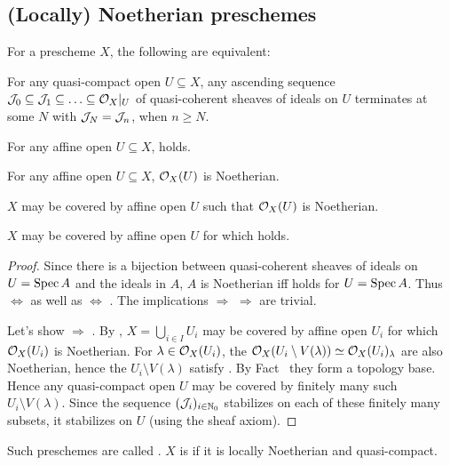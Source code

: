 \documentclass[a4paper,parskip=half,numbers=enddot, DIV=12]{scrreprt}
\begin{document}
\subsection{(Locally) Noetherian preschemes}

\begin{prop}
    For a prescheme $X$, the following are equivalent:
    \begin{alphanumerate}
    \item 
        For any quasi-compact open $U\subseteq X$, any ascending sequence $\mathcal{J}_0\subseteq \mathcal{J}_1\subseteq\ldots \subseteq \mathcal{O}_X|_U$ of quasi-coherent sheaves of ideals on $U$ terminates at some $N$ with $\mathcal{J}_N= \mathcal{J}_n$, when $n\geq N$.
    \item 
        For any affine open $U\subseteq X$,  holds.
    \item 
        For any affine open $U\subseteq X$, $\mathcal{O}_X(U)$ is Noetherian.
    \item  
        $X$ may be covered by affine open $U$ such that $\mathcal{O}_X(U)$ is Noetherian.
    \item   
        $X$ may be covered by affine open $U$ for which  holds.
    \end{alphanumerate}
\end{prop}
\begin{proof}
    Since there is a bijection between quasi-coherent sheaves of ideals on $U=\operatorname{Spec} A$ and the ideals in $A$, $A$ is Noetherian iff  holds for $U=\operatorname{Spec} A$. Thus  $\Leftrightarrow$  as well as  $\Leftrightarrow$ . The implications  $\Rightarrow$  $\Rightarrow$  are trivial.  
    
    Let's show  $\Rightarrow$ . By , $X=\bigcup_{i\in I}U_i$ may be covered by affine open $U_i$ for which $\mathcal{O}_X(U_i)$ is Noetherian. For $\lambda\in\mathcal{O}_X(U_i)$, the $\mathcal{O}_X(U_i\setminus V(\lambda)) \simeq \mathcal{O}_X(U_i)_\lambda$ are also Noetherian, hence the $U_i\setminus V(\lambda)$ satisfy . By Fact~ they form a topology base. Hence any quasi-compact open $U$ may be covered by finitely many such $U_i\setminus V(\lambda)$. Since the sequence $(\mathcal{J}_i)_{i\in\mathbb{N}_0}$ stabilizes on each of these finitely many subsets, it stabilizes on $U$ (using the sheaf axiom).
\end{proof}
\begin{defi}
    Such preschemes are called . $X$ is  if it is locally Noetherian and quasi-compact.
\end{defi}
\end{document}
